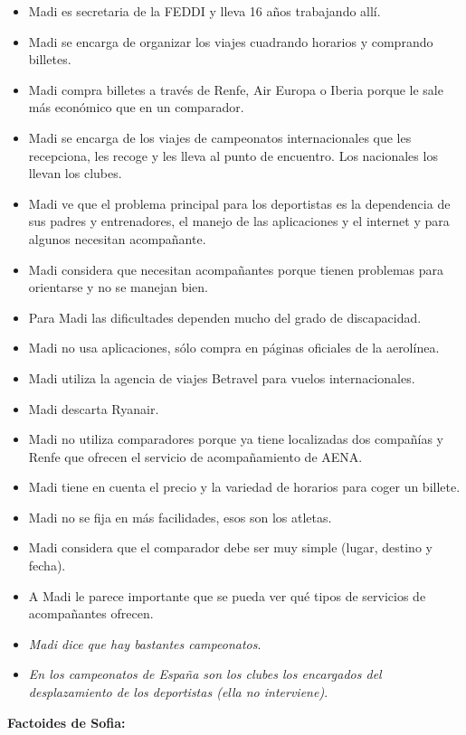 \begin{itemize}
    \item Madi es secretaria de la FEDDI y lleva 16 años trabajando allí.
    \item Madi se encarga de organizar los viajes cuadrando horarios y comprando billetes.
    \item Madi compra billetes a través de Renfe, Air Europa o Iberia porque le sale más económico que en un comparador.
    \item Madi se encarga de los viajes de campeonatos internacionales que les recepciona, les recoge y les lleva al punto de encuentro. Los nacionales los llevan los clubes.
    \item Madi ve que el problema principal para los deportistas es la dependencia de sus padres y entrenadores, el manejo de las aplicaciones y el internet y para algunos necesitan acompañante.
    \item Madi considera que necesitan acompañantes porque tienen problemas para orientarse y no se manejan bien.
    \item Para Madi las dificultades dependen mucho del grado de discapacidad.
    \item Madi no usa aplicaciones, sólo compra en páginas oficiales de la aerolínea.
    \item Madi utiliza la agencia de viajes Betravel para vuelos internacionales.
    \item Madi descarta Ryanair.
    \item Madi no utiliza comparadores porque ya tiene localizadas dos compañías y Renfe que ofrecen el servicio de acompañamiento de AENA.
    \item Madi tiene en cuenta el precio y la variedad de horarios para coger un billete.
    \item Madi no se fija en más facilidades, esos son los atletas.
    \item Madi considera que el comparador debe ser muy simple (lugar, destino y fecha).
    \item A Madi le parece importante que se pueda ver qué tipos de servicios de acompañantes ofrecen.
    \item \textit{Madi dice que hay bastantes campeonatos}.
    \item \textit{En los campeonatos de España son los clubes los encargados del desplazamiento de los deportistas (ella no interviene)}.
\end{itemize}


\textbf{Factoides de Sofia:}

